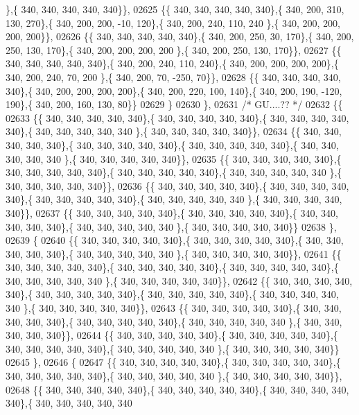 \begin{DoxyCode}
      \},\{ 340, 340, 340, 340, 340\}\},
02625 \{\{ 340, 340, 340, 340, 340\},\{ 340, 200, 310, 130, 270\},\{ 340, 200, 200, -10, 120\},\{ 340, 200, 240, 110, 240
      \},\{ 340, 200, 200, 200, 200\}\},
02626 \{\{ 340, 340, 340, 340, 340\},\{ 340, 200, 250,  30, 170\},\{ 340, 200, 250, 130, 170\},\{ 340, 200, 200, 200, 200
      \},\{ 340, 200, 250, 130, 170\}\},
02627 \{\{ 340, 340, 340, 340, 340\},\{ 340, 200, 240, 110, 240\},\{ 340, 200, 200, 200, 200\},\{ 340, 200, 240,  70, 200
      \},\{ 340, 200,  70, -250,  70\}\},
02628 \{\{ 340, 340, 340, 340, 340\},\{ 340, 200, 200, 200, 200\},\{ 340, 200, 220, 100, 140\},\{ 340, 200, 190, -120, 
      190\},\{ 340, 200, 160, 130,  80\}\}
02629 \}
02630 \},
02631 \textcolor{comment}{/* GU....?? */}
02632 \{\{
02633 \{\{ 340, 340, 340, 340, 340\},\{ 340, 340, 340, 340, 340\},\{ 340, 340, 340, 340, 340\},\{ 340, 340, 340, 340, 340
      \},\{ 340, 340, 340, 340, 340\}\},
02634 \{\{ 340, 340, 340, 340, 340\},\{ 340, 340, 340, 340, 340\},\{ 340, 340, 340, 340, 340\},\{ 340, 340, 340, 340, 340
      \},\{ 340, 340, 340, 340, 340\}\},
02635 \{\{ 340, 340, 340, 340, 340\},\{ 340, 340, 340, 340, 340\},\{ 340, 340, 340, 340, 340\},\{ 340, 340, 340, 340, 340
      \},\{ 340, 340, 340, 340, 340\}\},
02636 \{\{ 340, 340, 340, 340, 340\},\{ 340, 340, 340, 340, 340\},\{ 340, 340, 340, 340, 340\},\{ 340, 340, 340, 340, 340
      \},\{ 340, 340, 340, 340, 340\}\},
02637 \{\{ 340, 340, 340, 340, 340\},\{ 340, 340, 340, 340, 340\},\{ 340, 340, 340, 340, 340\},\{ 340, 340, 340, 340, 340
      \},\{ 340, 340, 340, 340, 340\}\}
02638 \},
02639 \{
02640 \{\{ 340, 340, 340, 340, 340\},\{ 340, 340, 340, 340, 340\},\{ 340, 340, 340, 340, 340\},\{ 340, 340, 340, 340, 340
      \},\{ 340, 340, 340, 340, 340\}\},
02641 \{\{ 340, 340, 340, 340, 340\},\{ 340, 340, 340, 340, 340\},\{ 340, 340, 340, 340, 340\},\{ 340, 340, 340, 340, 340
      \},\{ 340, 340, 340, 340, 340\}\},
02642 \{\{ 340, 340, 340, 340, 340\},\{ 340, 340, 340, 340, 340\},\{ 340, 340, 340, 340, 340\},\{ 340, 340, 340, 340, 340
      \},\{ 340, 340, 340, 340, 340\}\},
02643 \{\{ 340, 340, 340, 340, 340\},\{ 340, 340, 340, 340, 340\},\{ 340, 340, 340, 340, 340\},\{ 340, 340, 340, 340, 340
      \},\{ 340, 340, 340, 340, 340\}\},
02644 \{\{ 340, 340, 340, 340, 340\},\{ 340, 340, 340, 340, 340\},\{ 340, 340, 340, 340, 340\},\{ 340, 340, 340, 340, 340
      \},\{ 340, 340, 340, 340, 340\}\}
02645 \},
02646 \{
02647 \{\{ 340, 340, 340, 340, 340\},\{ 340, 340, 340, 340, 340\},\{ 340, 340, 340, 340, 340\},\{ 340, 340, 340, 340, 340
      \},\{ 340, 340, 340, 340, 340\}\},
02648 \{\{ 340, 340, 340, 340, 340\},\{ 340, 340, 340, 340, 340\},\{ 340, 340, 340, 340, 340\},\{ 340, 340, 340, 340, 340

\end{DoxyCode}
